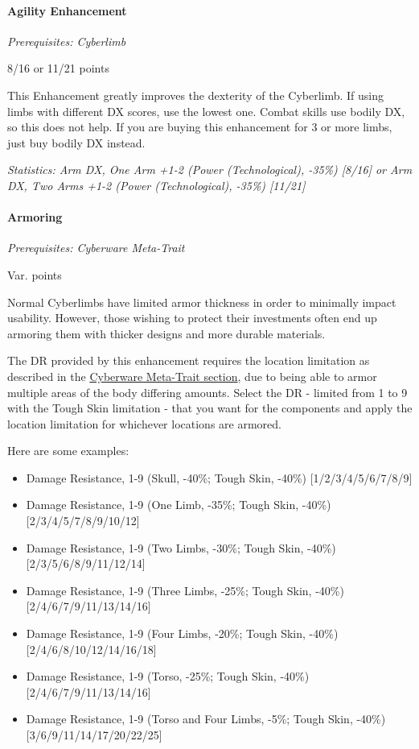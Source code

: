\begin{multicols*}{3}
	\paragraph{Agility Enhancement}
	\textit{Prerequisites: Cyberlimb}
	\begin{flushright}
		8/16 or 11/21 points
	\end{flushright}
	
	This Enhancement greatly improves the dexterity of the Cyberlimb. If using limbs with different DX scores, use the lowest one. Combat skills use bodily DX, so this does not help. If you are buying this enhancement for 3 or more limbs, just buy bodily DX instead. 
	
	\textit{\textcolor{OliveGreen}{Statistics: Arm DX, One Arm +1-2 (Power (Technological), -35\%) [8/16] or Arm DX, Two Arms +1-2 (Power (Technological), -35\%) [11/21]}}
	
	\paragraph{Armoring}
	\textit{Prerequisites: Cyberware Meta-Trait}
	\begin{flushright}
		Var. points
	\end{flushright}
	
	Normal Cyberlimbs have limited armor thickness in order to minimally impact usability. However, those wishing to protect their investments often end up armoring them with thicker designs and more durable materials.
	
	The DR provided by this enhancement requires the location limitation as described in the \hyperref[cyberware-meta-trait]{Cyberware Meta-Trait section}, due to being able to armor multiple areas of the body differing amounts. Select the DR - limited from 1 to 9 with the Tough Skin limitation - that you want for the components and apply the location limitation for whichever locations are armored.
	
	Here are some examples:
	
	\begin{itemize}
		\itemsep0em 
		\item Damage Resistance, 1-9 (Skull, -40\%; Tough Skin, -40\%) [1/2/3/4/5/6/7/8/9]
		\item Damage Resistance, 1-9 (One Limb, -35\%; Tough Skin, -40\%) [2/3/4/5/7/8/9/10/12]
		\item Damage Resistance, 1-9 (Two Limbs, -30\%; Tough Skin, -40\%) [2/3/5/6/8/9/11/12/14]
		\item Damage Resistance, 1-9 (Three Limbs, -25\%; Tough Skin, -40\%) [2/4/6/7/9/11/13/14/16]
		\item Damage Resistance, 1-9 (Four Limbs, -20\%; Tough Skin, -40\%) [2/4/6/8/10/12/14/16/18]
		\item Damage Resistance, 1-9 (Torso, -25\%; Tough Skin, -40\%) [2/4/6/7/9/11/13/14/16]
		\item Damage Resistance, 1-9 (Torso and Four Limbs, -5\%; Tough Skin, -40\%) [3/6/9/11/14/17/20/22/25]
	\end{itemize}
	

\end{multicols*}
